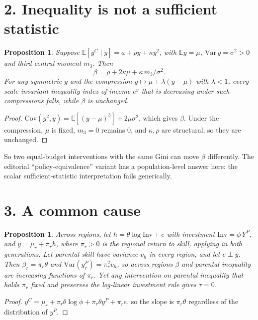 \documentclass[11pt]{article}
\newtheorem{proposition}[theorem]{Proposition}
\theoremstyle{definition}
\begin{document}
\section*{2. Inequality is not a sufficient statistic}
\begin{proposition}\label{prop:skew}
Suppose $\mathbb E[y^C\mid y]=a+\rho y+\kappa y^2$, with $\mathbb E y=\mu$, $\mathrm{Var}\,y=\sigma^2>0$ and third central
moment $m_3$. Then
\[
 \beta=\rho+2\kappa\mu+\kappa\,m_3/\sigma^2 .
\]
For any symmetric $y$ and the compression $y\mapsto\mu+\lambda(y-\mu)$ with $\lambda<1$, every scale-invariant inequality index
of income $e^y$ that is decreasing under such compressions falls, while $\beta$ is unchanged.
\end{proposition}
\begin{proof}
$\mathrm{Cov}(y^2,y)=\mathbb E[(y-\mu)^3]+2\mu\sigma^2$, which gives $\beta$. Under the compression, $\mu$ is fixed,
$m_3=0$ remains $0$, and $\kappa,\rho$ are structural, so they are unchanged.
\end{proof}
So two equal-budget interventions with the same Gini can move $\beta$ differently. The editorial ``policy-equivalence''
variant has a population-level answer here: the scalar sufficient-statistic interpretation fails generically.

\section*{3. A common cause}
\begin{proposition}\label{prop:common}
Across regions, let $h=\theta\log\mathrm{Inv}+e$ with investment $\mathrm{Inv}=\phi\,Y^P$, and
$y=\mu_r+\pi_rh$, where $\pi_r>0$ is the regional return to skill, applying in both generations. Let parental skill have
variance $v_h$ in every region, and let $e\perp y$. Then $\beta_r=\pi_r\theta$ and $\mathrm{Var}(y^P_r)=\pi_r^2v_h$, so
across regions $\beta$ and parental inequality are increasing functions of $\pi_r$. Yet any intervention on parental
inequality that holds $\pi_r$ fixed and preserves the log-linear investment rule gives $\tau=0$.
\end{proposition}
\begin{proof}
$y^C=\mu_r+\pi_r\theta\log\phi+\pi_r\theta y^P+\pi_re$, so the slope is $\pi_r\theta$ regardless of the distribution of
$y^P$.
\end{proof}
\end{document}
